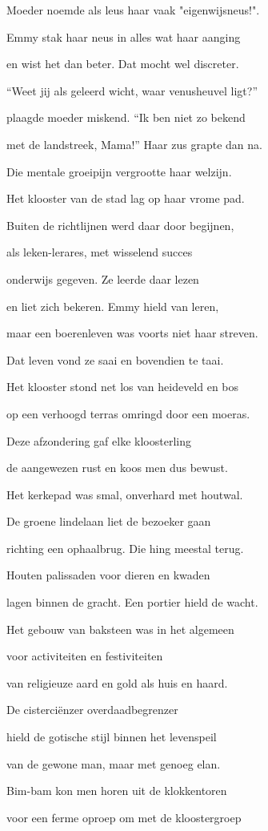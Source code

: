 Moeder noemde als leus
haar vaak "eigenwijsneus!".

Emmy stak haar neus in
alles wat haar aanging

en wist het dan beter.
Dat mocht wel discreter.

“Weet jij als geleerd wicht,
waar venusheuvel ligt?”

plaagde moeder miskend.
“Ik ben niet zo bekend

met de landstreek, Mama!”
Haar zus grapte dan na.

Die mentale groeipijn
vergrootte haar welzijn.

Het klooster van de stad
lag op haar vrome pad.

Buiten de richtlijnen
werd daar door begijnen,

als leken-lerares,
met wisselend succes

onderwijs gegeven.
Ze leerde daar lezen

en liet zich bekeren.
Emmy hield van leren,

maar een boerenleven
was voorts niet haar streven.

Dat leven vond ze saai
en bovendien te taai.

Het klooster stond net los
van heideveld en bos

op een verhoogd terras
omringd door een moeras.

Deze afzondering
gaf elke kloosterling

de aangewezen rust
en koos men dus bewust.

Het kerkepad was smal,
onverhard met houtwal.

De groene lindelaan
liet de bezoeker gaan

richting een ophaalbrug.
Die hing meestal terug.

Houten palissaden
voor dieren en kwaden

lagen binnen de gracht.
Een portier hield de wacht.

Het gebouw van baksteen
was in het algemeen

voor activiteiten
en festiviteiten

van religieuze aard
en gold als huis en haard.

De cisterciënzer
overdaadbegrenzer

hield de gotische stijl
binnen het levenspeil

van de gewone man,
maar met genoeg elan.

Bim-bam kon men horen
uit de klokkentoren

voor een ferme oproep
om met de kloostergroep


